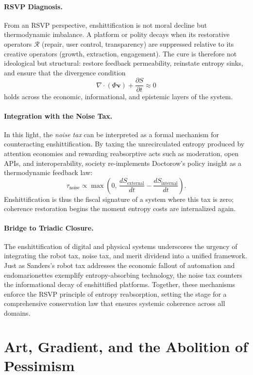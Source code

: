 \documentclass[12pt]{article}
\begin{document}
\paragraph{RSVP Diagnosis.}
From an RSVP perspective, enshittification is not moral decline but thermodynamic imbalance. A platform or polity decays when its restorative operators $\mathcal{R}$ (repair, user control, transparency) are suppressed relative to its creative operators (growth, extraction, engagement). The cure is therefore not ideological but structural: restore feedback permeability, reinstate entropy sinks, and ensure that the divergence condition
\[
\nabla\!\cdot(\Phi\mathbf{v}) + \frac{\partial S}{\partial t} \approx 0
\]
holds across the economic, informational, and epistemic layers of the system.

\paragraph{Integration with the Noise Tax.}
In this light, the \emph{noise tax} can be interpreted as a formal mechanism for counteracting enshittification. By taxing the unrecirculated entropy produced by attention economies and rewarding reabsorptive acts such as moderation, open APIs, and interoperability, society re-implements Doctorow’s policy insight as a thermodynamic feedback law:
\[
\tau_{\text{noise}} \propto \max\!\left(0,\,\frac{dS_{\text{external}}}{dt} - \frac{dS_{\text{internal}}}{dt}\right).
\]
Enshittification is thus the fiscal signature of a system where this tax is zero; coherence restoration begins the moment entropy costs are internalized again.

\paragraph{Bridge to Triadic Closure.}
The enshittification of digital and physical systems underscores the urgency of integrating the robot tax, noise tax, and merit dividend into a unified framework. Just as Sanders’s robot tax addresses the economic fallout of automation and endomarionettes exemplify entropy-absorbing technology, the noise tax counters the informational decay of enshittified platforms. Together, these mechanisms enforce the RSVP principle of entropy reabsorption, setting the stage for a comprehensive conservation law that ensures systemic coherence across all domains.

\section{Art, Gradient, and the Abolition of Pessimism}
\label{sec:abolition-pessimism}
\end{document}
